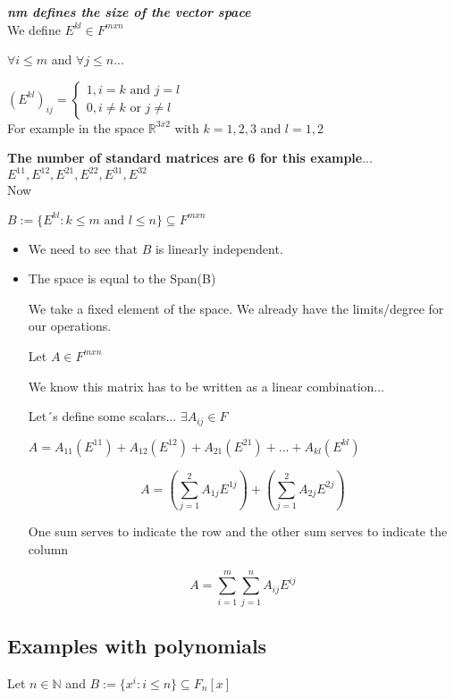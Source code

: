 \documentclass{article}
\begin{document}
\textbf{\textit{nm defines the size of the vector space}}
\\

We define \(E^{kl} \in F^{mxn}\)

\(\forall i \leq m\) and \(\forall j \leq n\)...

\((E^{kl})_{ij} = \begin{cases}
    1, i = k \text{ and } j =l\\
    0, i \neq k \text{ or } j \neq l
\end{cases}\)
\\

For example in the space \(\mathbb{R}^{3x2}\) with \(k = 1,2,3\) and \(l=1,2\)

\textbf{The number of standard matrices are 6 for this example}... \(E^{11}, E^{12}, E^{21}, E^{22}, E^{31}, E^{32}\)
\\

Now

\(B := \{E^{kl} : k\leq m \text{ and } l \leq n\} \subseteq F^{mxn}\)
\begin{itemize}
    \item We need to see that \(B\) is linearly independent.
    \item The space is equal to the Span(B)

    We take a fixed element of the space. We already have the limits/degree for our operations.

    Let \(A \in F^{mxn}\)

    We know this matrix has to be written as a linear combination...

    Let´s define some scalars... \(\exists A_{ij} \in F\)

    \(A = A_{11} (E^{11}) + A_{12} (E^{12}) + A_{21} (E^{21}) + ... + A_{kl} (E^{kl})\)

    \[A = (\sum_{j=1}^{2} A_{1j} E^{1j}) + (\sum_{j=1}^{2} A_{2j} E^{2j})\]

    One sum serves to indicate the row and the other sum serves to indicate the column

    \[
    A  = \sum_{i=1}^{m} \sum_{j=1}^{n} A_{ij}E^{ij}
    \]
\end{itemize}

\subsection*{Examples with polynomials}

Let \(n \in \mathbb{N}\) and \(B := \{x^i : i \leq n\} \subseteq F_n[x]\)
\end{document}
